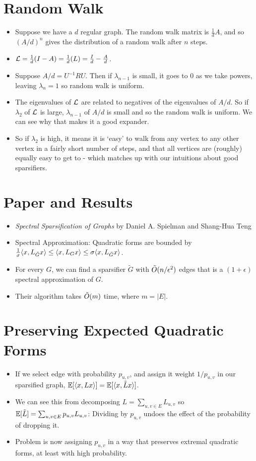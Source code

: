 \documentclass[11pt]{article}
\begin{document}
\section{Random Walk}
\label{sec:org0686358}
\begin{itemize}
\item Suppose we have a \(d\) regular graph. The random walk matrix is \(\frac{1}{d}A\), and so \((A/d)^n\) gives the distribution of a random walk after \(n\) steps.
\item \(\mathcal{L}=\frac{1}{d}(I-A)=\frac{1}{d}(L)=\frac{I}{d}-\frac{A}{d}\).
\item Suppose \(A/d=U^{-1}RU\). Then if \(\lambda_{n-1}\) is small, it goes to \(0\) as we take powers, leaving \(\lambda_n=1\) so random walk is uniform.
\item The eigenvalues of \(\mathcal{L}\) are related to negatives of the eigenvalues of \(A/d\). So if \(\lambda_2\) of \(\mathcal{L}\) is large, \(\lambda_{n-1}\) of \(A/d\) is small and so the random walk is uniform. We can see why that makes it a good expander.
\item So if \(\lambda_2\) is high, it means it is `easy' to walk from any vertex to any other vertex in a fairly short number of steps, and that all vertices are (roughly) equally easy to get to - which matches up with our intuitions about good sparsifiers.
\end{itemize}
\section{Paper and Results}
\label{sec:org875aa3b}
\begin{itemize}
\item \emph{Spectral Sparsification of Graphs} by Daniel A. Spielman and Shang-Hua Teng
\item Spectral Approximation: Quadratic forms are bounded by \(\frac{1}{\sigma}\langle x , L_{\tilde{G}}x \rangle \le \langle x , L_Gx \rangle \le \sigma\langle x , L_{\tilde{G}}x \rangle\).
\item For every \(G\), we can find a sparsifier \(\tilde{G}\) with \(\tilde{O}(n/\epsilon^2)\) edges that is a \((1+\epsilon)\) spectral approximation of \(G\).
\item Their algorithm takes \(\tilde{O}(m)\) time, where \(m=|E|\).
\end{itemize}
\section{Preserving Expected Quadratic Forms}
\label{sec:orgd9c2dc6}
\begin{itemize}
\item If we select edge with probability \(p_{u,v}\), and assign it weight \(1/p_{u,v}\) in our sparsified graph, \(\mathbb{E}[\langle x , Lx \rangle]=\mathbb{E}[\langle x , \tilde{L}x \rangle]\).
\item We can see this from decomposing \(L=\sum_{u,v \in E}L_{u,v}\) so \(\mathbb{E}[\tilde{L}]=\sum_{u,v \in E}p_{u,v}L_{u,v}\): Dividing by \(p_{u,v}\) undoes the effect of the probability of dropping it.
\item Problem is now assigning \(p_{u,v}\) in a way that preserves extremal quadratic forms, at least with high probability.
\end{itemize}
\end{document}
